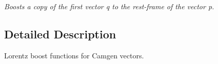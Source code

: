 \begin{DoxyCompactItemize}
\begin{DoxyCompactList}\small\item\em Boosts a copy of the first vector q to the rest-\/frame of the vector p. \end{DoxyCompactList}\end{DoxyCompactItemize}


\subsection{Detailed Description}
Lorentz boost functions for Camgen vectors. 

